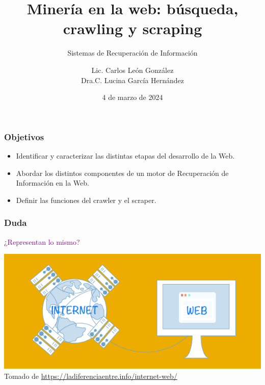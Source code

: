\documentclass[
10pt, %
aspectratio=169, %
]{beamer}
\title[Short Title]{Minería en la web: búsqueda, crawling y scraping}
\subtitle{Sistemas de Recuperación de Información}
\author{Lic. Carlos León González \\ Dra.C. Lucina García Hernández}
\institute[UC]{Facultad de Matem\'atica y Computaci\'on \\ Universidad de La Habana \\ \smallskip }
\date{4 de marzo de  2024} %
\begin{document}
	
	
	
	\begin{frame}
		\titlepage
	\end{frame}
	
	\begin{frame}
		
		\frametitle{Objetivos}
		
		\begin{itemize}

			\item Identificar y caracterizar las distintas etapas del desarrollo de la Web.
			
			\item Abordar los distintos componentes de un motor de Recuperación de Información en la Web.
			
			\item Definir las funciones del crawler y el scraper.
						
		\end{itemize}
		
	\end{frame}
	
	\begin{frame}
		
		\frametitle{Duda}
		
		\centering 
		
		\textcolor{purple}{
			¿Representan lo mismo?
		} 
		
		\vspace{1\baselineskip}
		
		\includegraphics[scale=0.5]{internet-web.png} \\[2mm]
		
		{\scriptsize Tomado de \url{https://ladiferenciaentre.info/internet-web/}}
		
	\end{frame}
	
\end{document}
